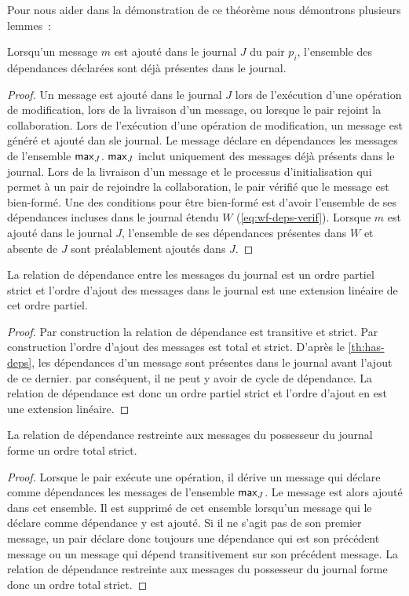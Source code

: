 Pour nous aider dans la démonstration de ce théorème nous démontrons plusieurs lemmes~:

\begin{lemma}\label{th:has-deps}
Lorsqu'un message $m$ est ajouté dans le journal $J$ du pair $p_i$, l'ensemble des dépendances déclarées sont déjà présentes dans le journal.
\end{lemma} 
\begin{proof}
Un message est ajouté dans le journal $J$ lors de l'exécution d'une opération de modification, lors de la livraison d'un message, ou lorsque le pair rejoint la collaboration.
Lors de l'exécution d'une opération de modification, un message est généré et ajouté dan sle journal.
Le message déclare en dépendances les messages de l'ensemble $\operatorname{\mathsf{max}}_J$.
$\operatorname{\mathsf{max}}_J$ inclut uniquement des messages déjà présents dans le journal.
Lors de la livraison d'un message et le processus d'initialisation qui permet à un pair de rejoindre la collaboration, le pair vérifié que le message est bien-formé.
Une des conditions pour être bien-formé est d'avoir l'ensemble de ses dépendances incluses dans le journal étendu $W$ (\autoref{eq:wf-deps-verif}).
Lorsque $m$ est ajouté dans le journal $J$, l'ensemble de ses dépendances présentes dans $W$ et absente de $J$ sont préalablement ajoutés dans $J$.
\end{proof}

\begin{lemma}
La relation de dépendance entre les messages du journal est un ordre partiel strict et l'ordre d'ajout des messages dans le journal est une extension linéaire de cet ordre partiel.
\end{lemma}
\begin{proof}
Par construction la relation de dépendance est transitive et strict.
Par construction l'ordre d'ajout des messages est total et strict.
D'après le \autoref{th:has-deps}, les dépendances d'un message sont présentes dans le journal avant l'ajout de ce dernier.
par conséquent, il ne peut y avoir de cycle de dépendance.
La relation de dépendance est donc un ordre partiel strict et l'ordre d'ajout en est une extension linéaire.
\end{proof}

\begin{lemma}\label{th:total-dep-owner}
La relation de dépendance restreinte aux messages du possesseur du journal forme un ordre total strict.
\end{lemma}
\begin{proof}
Lorsque le pair exécute une opération, il dérive un message qui déclare comme dépendances les messages de l'ensemble $\operatorname{\mathsf{max}}_J$.
Le message est alors ajouté dans cet ensemble.
Il est supprimé de cet ensemble lorsqu'un message qui le déclare comme dépendance y est ajouté.
Si il ne s'agit pas de son premier message, un pair déclare donc toujours une dépendance qui est son précédent message ou un message qui dépend transitivement sur son précédent message.
La relation de dépendance restreinte aux messages du possesseur du journal forme donc un ordre total strict.
\end{proof}

